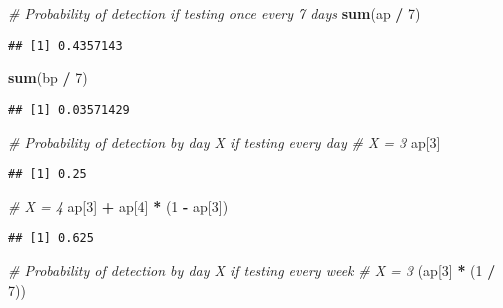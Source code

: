 \documentclass[
]{article}
\newenvironment{Shaded}{\begin{snugshade}}{\end{snugshade}}
\newcommand{\CommentTok}[1]{\textcolor[rgb]{0.56,0.35,0.01}{\textit{#1}}}
\newcommand{\DecValTok}[1]{\textcolor[rgb]{0.00,0.00,0.81}{#1}}
\newcommand{\KeywordTok}[1]{\textcolor[rgb]{0.13,0.29,0.53}{\textbf{#1}}}
\newcommand{\NormalTok}[1]{#1}
\newcommand{\OperatorTok}[1]{\textcolor[rgb]{0.81,0.36,0.00}{\textbf{#1}}}
\newcommand{\StringTok}[1]{\textcolor[rgb]{0.31,0.60,0.02}{#1}}
\begin{document}
\begin{Shaded}
\begin{Highlighting}[]
\CommentTok{# Probability of detection if testing once every 7 days}
\KeywordTok{sum}\NormalTok{(ap }\OperatorTok{/}\StringTok{ }\DecValTok{7}\NormalTok{)}
\end{Highlighting}
\end{Shaded}

\begin{verbatim}
## [1] 0.4357143
\end{verbatim}

\begin{Shaded}
\begin{Highlighting}[]
\KeywordTok{sum}\NormalTok{(bp }\OperatorTok{/}\StringTok{ }\DecValTok{7}\NormalTok{)}
\end{Highlighting}
\end{Shaded}

\begin{verbatim}
## [1] 0.03571429
\end{verbatim}

\begin{Shaded}
\begin{Highlighting}[]
\CommentTok{# Probability of detection by day X if testing every day}
\CommentTok{# X = 3}
\NormalTok{ap[}\DecValTok{3}\NormalTok{]}
\end{Highlighting}
\end{Shaded}

\begin{verbatim}
## [1] 0.25
\end{verbatim}

\begin{Shaded}
\begin{Highlighting}[]
\CommentTok{# X = 4}
\NormalTok{ap[}\DecValTok{3}\NormalTok{] }\OperatorTok{+}\StringTok{ }\NormalTok{ap[}\DecValTok{4}\NormalTok{] }\OperatorTok{*}\StringTok{ }\NormalTok{(}\DecValTok{1} \OperatorTok{-}\StringTok{ }\NormalTok{ap[}\DecValTok{3}\NormalTok{])}
\end{Highlighting}
\end{Shaded}

\begin{verbatim}
## [1] 0.625
\end{verbatim}

\begin{Shaded}
\begin{Highlighting}[]
\CommentTok{# Probability of detection by day X if testing every week}
\CommentTok{# X = 3}
\NormalTok{(ap[}\DecValTok{3}\NormalTok{] }\OperatorTok{*}\StringTok{ }\NormalTok{(}\DecValTok{1} \OperatorTok{/}\StringTok{ }\DecValTok{7}\NormalTok{))}
\end{Highlighting}
\end{Shaded}
\end{document}
